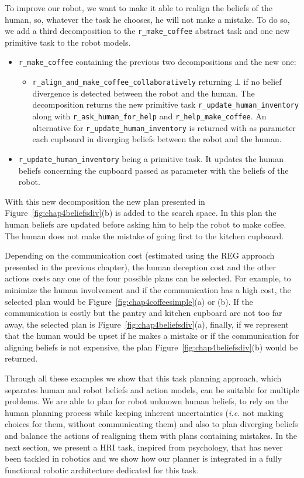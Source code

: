 \documentclass[a4paper,11pt,twoside]{StyleThese}
\begin{document}
To improve our robot, we want to make it able to realign the beliefs of the human, so, whatever the task he chooses, he will not make a mistake. To do so, we add a third decomposition to the \verb'r_make_coffee' abstract task and one new primitive task to the robot models.
\begin{itemize}
\item \verb'r_make_coffee' containing the previous two decompositions and the new one:
	\begin{itemize}
	\item \verb'r_align_and_make_coffee_collaboratively' returning $\bot$ if no belief divergence is detected between the robot and the human. The decomposition returns the new primitive task \verb'r_update_human_inventory' along with \verb'r_ask_human_for_help' and \verb'r_help_make_coffee'. An alternative for \verb'r_update_human_inventory' is returned with as parameter each cupboard in diverging beliefs between the robot and the human.
	\end{itemize}
\item \verb'r_update_human_inventory' being a primitive task. It updates the human beliefs concerning the cupboard passed as parameter with the beliefs of the robot.
\end{itemize}

With this new decomposition the new plan presented in Figure~\ref{fig:chap4beliefsdiv}(b) is added to the search space. In this plan the human beliefs are updated before asking him to help the robot to make coffee. The human does not make the mistake of going first to the kitchen cupboard.

Depending on the communication cost (estimated using the REG approach presented in the previous chapter), the human deception cost and the other actions costs any one of the four possible plans can be selected. For example, to minimize the human involvement and if the communication has a high cost, the selected plan would be Figure~\ref{fig:chap4coffeesimple}(a) or (b). If the communication is costly but the pantry and kitchen cupboard are not too far away, the selected plan is Figure~\ref{fig:chap4beliefsdiv}(a), finally, if we represent that the human would be upset if he makes a mistake or if the communication for aligning beliefs is not expensive, the plan Figure~\ref{fig:chap4beliefsdiv}(b) would be returned.

Through all these examples we show that this task planning approach, which separates human and robot beliefs and action models, can be suitable for multiple problems. We are able to plan for robot unknown human beliefs, to rely on the human planning process while keeping inherent uncertainties (\textit{i.e.} not making choices for them, without communicating them) and also to plan diverging beliefs and balance the actions of realigning them with plans containing mistakes. In the next section, we present a HRI task, inspired from psychology, that has never been tackled in robotics and we show how our planner is integrated in a fully functional robotic architecture dedicated for this task.
\end{document}
